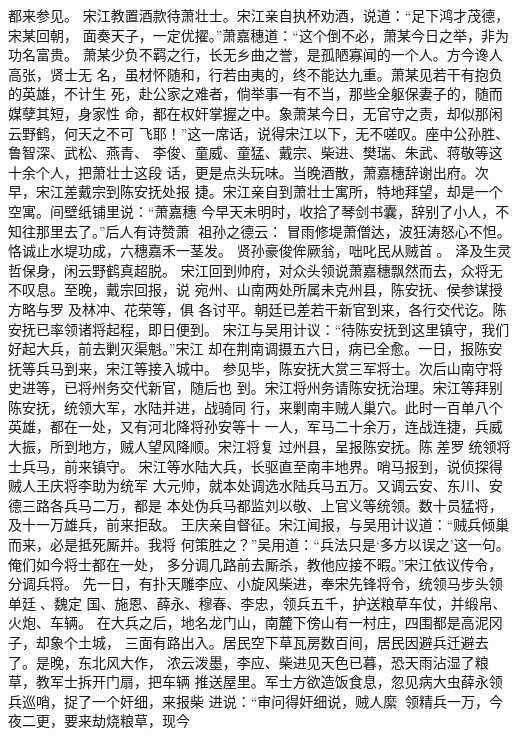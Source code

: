 都来参见。
宋江教置酒款待萧壮士。宋江亲自执杯劝酒，说道：“足下鸿才茂德，宋某回朝，
面奏天子，一定优擢。”萧嘉穗道：“这个倒不必，萧某今日之举，非为功名富贵。
萧某少负不羁之行，长无乡曲之誉，是孤陋寡闻的一个人。方今谗人高张，贤士无
名，虽材怀随和，行若由夷的，终不能达九重。萧某见若干有抱负的英雄，不计生
死，赴公家之难者，倘举事一有不当，那些全躯保妻子的，随而媒孽其短，身家性
命，都在权奸掌握之中。象萧某今日，无官守之责，却似那闲云野鹤，何天之不可
飞耶！”这一席话，说得宋江以下，无不嗟叹。座中公孙胜、鲁智深、武松、燕青、
李俊、童威、童猛、戴宗、柴进、樊瑞、朱武、蒋敬等这十余个人，把萧壮士这段
话，更是点头玩味。当晚酒散，萧嘉穗辞谢出府。次早，宋江差戴宗到陈安抚处报
捷。宋江亲自到萧壮士寓所，特地拜望，却是一个空寓。间壁纸铺里说：“萧嘉穗
今早天未明时，收拾了琴剑书囊，辞别了小人，不知往那里去了。”后人有诗赞萧
祖孙之德云：
冒雨修堤萧僧达，波狂涛怒心不怛。
恪诚止水堤功成，六穗嘉禾一茎发。
贤孙豪俊侔厥翁，咄叱民从贼首。
泽及生灵哲保身，闲云野鹤真超脱。
宋江回到帅府，对众头领说萧嘉穗飘然而去，众将无不叹息。至晚，戴宗回报，说
宛州、山南两处所属未克州县，陈安抚、侯参谋授方略与罗及林冲、花荣等，俱
各讨平。朝廷已差若干新官到来，各行交代讫。陈安抚已率领诸将起程，即日便到。
宋江与吴用计议：“待陈安抚到这里镇守，我们好起大兵，前去剿灭渠魁。”宋江
却在荆南调摄五六日，病已全愈。一日，报陈安抚等兵马到来，宋江等接入城中。
参见毕，陈安抚大赏三军将士。次后山南守将史进等，已将州务交代新官，随后也
到。宋江将州务请陈安抚治理。宋江等拜别陈安抚，统领大军，水陆并进，战骑同
行，来剿南丰贼人巢穴。此时一百单八个英雄，都在一处，又有河北降将孙安等十
一人，军马二十余万，连战连捷，兵威大振，所到地方，贼人望风降顺。宋江将复
过州县，呈报陈安抚。陈差罗统领将士兵马，前来镇守。
宋江等水陆大兵，长驱直至南丰地界。哨马报到，说侦探得贼人王庆将李助为统军
大元帅，就本处调选水陆兵马五万。又调云安、东川、安德三路各兵马二万，都是
本处伪兵马都监刘以敬、上官义等统领。数十员猛将，及十一万雄兵，前来拒敌。
王庆亲自督征。宋江闻报，与吴用计议道：“贼兵倾巢而来，必是抵死厮并。我将
何策胜之？”吴用道：“兵法只是‘多方以误之’这一句。俺们如今将士都在一处，
多分调几路前去厮杀，教他应接不暇。”宋江依议传令，分调兵将。
先一日，有扑天雕李应、小旋风柴进，奉宋先锋将令，统领马步头领单廷、魏定
国、施恩、薛永、穆春、李忠，领兵五千，护送粮草车仗，并缎帛、火炮、车辆。
在大兵之后，地名龙门山，南麓下傍山有一村庄，四围都是高泥冈子，却象个土城，
三面有路出入。居民空下草瓦房数百间，居民因避兵迁避去了。是晚，东北风大作，
浓云泼墨，李应、柴进见天色已暮，恐天雨沾湿了粮草，教军士拆开门扇，把车辆
推送屋里。军士方欲造饭食息，忽见病大虫薛永领兵巡哨，捉了一个奸细，来报柴
进说：“审问得奸细说，贼人縻，领精兵一万，今夜二更，要来劫烧粮草，现今
